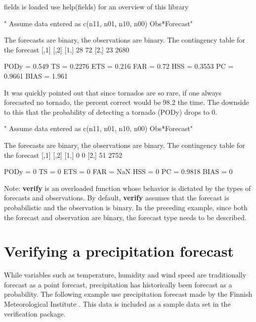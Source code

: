 \documentclass{article}
\begin{document}
\begin{Schunk}
\begin{Soutput}
fields is loaded use help(fields) for an overview of this library
\end{Soutput}
\begin{Soutput}
[1] " Assume data entered as c(n11, n01, n10, n00) Obs*Forecast"
\end{Soutput}
\begin{Soutput}
The forecasts are binary, the observations are binary.
The contingency table for the forecast 
     [,1] [,2]
[1,]   28   72
[2,]   23 2680

PODy =  0.549 
TS   =  0.2276 
ETS  =  0.216 
FAR  =   0.72 
HSS  =  0.3553 
PC   =  0.9661 
BIAS =  1.961 
\end{Soutput}
\end{Schunk}

It was quickly pointed out that since tornados are so rare, if one
always forecasted no tornado, the percent correct would be  98.2%
the time.  The downside to this that the probability of detecting a
tornado (PODy) drops to 0.

\begin{Schunk}
\begin{Soutput}
[1] " Assume data entered as c(n11, n01, n10, n00) Obs*Forecast"
\end{Soutput}
\begin{Soutput}
The forecasts are binary, the observations are binary.
The contingency table for the forecast 
     [,1] [,2]
[1,]    0    0
[2,]   51 2752

PODy =      0 
TS   =      0 
ETS  =      0 
FAR  =    NaN 
HSS  =      0 
PC   =  0.9818 
BIAS =      0 
\end{Soutput}
\end{Schunk}

Note: \textbf{verify} is an overloaded function
whose behavior is dictated by the types of forecasts and
observations.  By default, \textbf{verify} assumes that the forecast is
probabilistic and the observation is binary.  In the preceding
example, since both the forecast and observation are binary, the
forecast type needs to be described.
  
\section{Verifying a precipitation forecast} 

While variables such as temperature, humidity and wind speed
are traditionally forecast as a point forecast, precipitation
has historically been forecast as a probability.  The following
example use precipitation forecast made by the Finnish Meteorological
Institute \cite{fin}.  This data is included as a sample data set in
the verification package.
\end{document}
